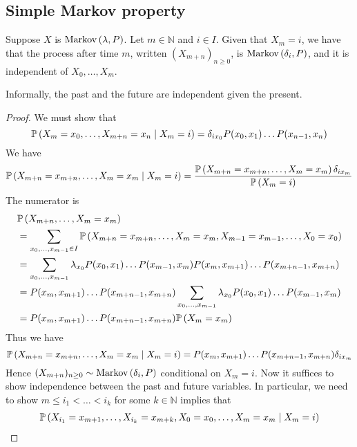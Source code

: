 \subsection{Simple Markov property}
\begin{theorem}
	Suppose \( X \) is \( \operatorname{Markov}\left({\lambda, P}\right) \).
	Let \( m \in \mathbb N \) and \( i \in I \).
	Given that \( X_m = i \), we have that the process after time \( m \), written \( (X_{m+n})_{n \geq 0} \), is \( \operatorname{Markov}\left({\delta_i, P}\right) \), and it is independent of \( X_0, \dots, X_m \).
\end{theorem}
Informally, the past and the future are independent given the present.
\begin{proof}
	We must show that
	\[
		\mathbb{P}\left({X_m = x_0, \dots, X_{m+n} = x_n \mid X_m = i}\right) = \delta_{i x_0} P(x_0, x_1) \dots P(x_{n-1}, x_n)
	\]
	We have
	\[
		\mathbb{P}\left({X_{m+n} = x_{m+n}, \dots, X_m = x_m \mid X_m = i}\right)
		= \frac{\mathbb{P}\left({X_{m+n} = x_{m+n}, \dots, X_m = x_m}\right) \delta_{i x_m}}{\mathbb{P}\left({X_m = i}\right)}
	\]
	The numerator is
	\begin{align*}
		 & \mathbb{P}\left({X_{m+n}, \dots, X_m = x_m}\right)                                                                                         \\ & = \sum_{x_0, \dots, x_{m-1} \in I} \mathbb{P}\left({X_{m+n} = x_{m+n}, \dots, X_m = x_m, X_{m-1} = x_{m-1}, \dots, X_0 = x_0}\right)       \\
		 & = \sum_{x_0, \dots, x_{m-1}} \lambda_{x_0} P(x_0, x_1) \dots P(x_{m-1}, x_m) P(x_m, x_{m+1}) \dots P(x_{m+n-1}, x_{m+n}) \\
		 & = P(x_m, x_{m+1}) \dots P(x_{m+n-1}, x_{m+n}) \sum_{x_0, \dots, x_{m-1}} \lambda_{x_0} P(x_0, x_1) \dots P(x_{m-1}, x_m) \\
		 & = P(x_m, x_{m+1}) \dots P(x_{m+n-1}, x_{m+n}) \mathbb{P}\left({X_m = x_m}\right)                                                           \\
	\end{align*}
	Thus we have
	\[
		\mathbb{P}\left({X_{m+n} = x_{m+n}, \dots, X_m = x_m \mid X_m = i}\right)
		= P(x_m, x_{m+1}) \dots P(x_{m+n-1}, x_{m+n}) \delta_{i x_m}
	\]
	Hence \( (X_{m+n})_{n \geq 0} \sim \operatorname{Markov}\left({\delta_i, P}\right) \) conditional on \( X_m = i \).
	Now it suffices to show independence between the past and future variables.
	In particular, we need to show \( m \leq i_1 < \dots < i_k \) for some \( k \in \mathbb N \) implies that
	\begin{align*}
		 & \prob{X_{i_1} = x_{m+1}, \dots, X_{i_k} = x_{m+k}, X_0 = x_0, \dots, X_m = x_m \mid X_m = i}                                               \\

\end{align*}
\end{proof}
